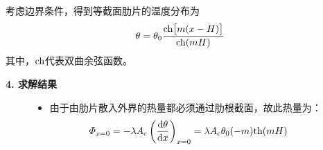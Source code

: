 考虑边界条件，得到等截面肋片的温度分布为
\begin{align}
	\theta = \theta_0 \dfrac{\text{ch} \big[m(x - H)\big]}{\text{ch} (mH)}
\end{align}
其中，$\text{ch}$代表双曲余弦函数。
\vspace*{0.5em}

\noindent \textbf{4. 求解结果}


	\begin{figure}[!htb]
		\begin{minipage}{0.73\linewidth}
			\begin{itemize}
				\item 由于由肋片散入外界的热量都必须通过肋根截面，故此热量为：
				\begin{align}
					\varPhi_{x = 0} = - \lambda A_{\text{c}}\left(\dfrac{{\rm{d}} \theta}{{\rm{d}} x}\right)_{x = 0} = \lambda A_{\text{c}} \theta_0 (-m) \text{th}(mH)
				\end{align}
				

\end{itemize}
\end{minipage}
\end{figure}
